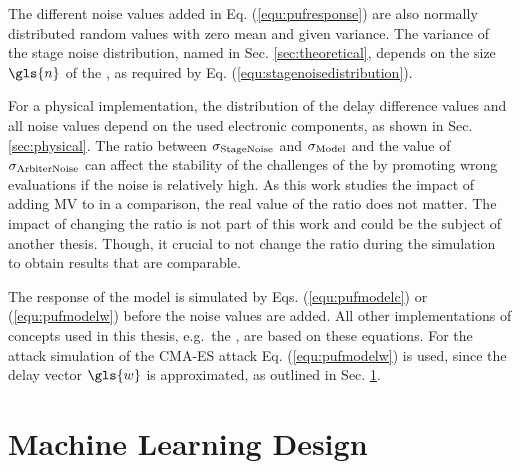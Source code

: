 The different noise values added in Eq. (\ref{equ:pufresponse}) are also normally distributed random values with zero mean and given variance.
The variance of the stage noise distribution, named in Sec. \ref{sec:theoretical}, depends on the size $\gls{n}$ of the \apuf, as required by Eq. (\ref{equ:stagenoisedistribution}).

For a physical \apuf implementation, the distribution of the delay difference values and all noise values depend on the used electronic components, as shown in Sec. \ref{sec:physical}.
The ratio between $\sigma_{\mathrm{Stage Noise}}$ and $\sigma_{\mathrm{Model}}$ and the value of $\sigma_{\mathrm{Arbiter Noise}}$ can affect the stability of the challenges of the \apuf by promoting wrong \puf evaluations if the noise is relatively high.
As this work studies the impact of adding \ac{MV} to \apufs in a comparison, the real value of the ratio does not matter.
The impact of changing the ratio is not part of this work and could be the subject of another thesis. 
Though, it crucial to not change the ratio during the simulation to obtain results that are comparable.

The response of the \apuf model is simulated by Eqs. (\ref{equ:pufmodelc}) or (\ref{equ:pufmodelw}) before the noise values are added.
All other implementations of \puf concepts used in this thesis, e.g.\ the \mpuf, are based on these \apuf equations.
For the attack simulation of the \ac{CMA-ES} attack Eq. (\ref{equ:pufmodelw}) is used, since the delay vector $\gls{w}$ is approximated, as outlined in Sec. \ref{sec:machinelearningdesign}.


\section{Machine Learning Design}
\label{sec:machinelearningdesign}

